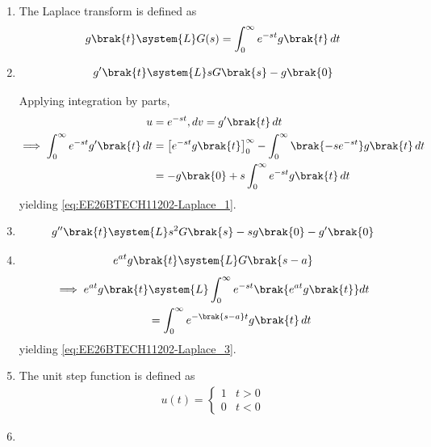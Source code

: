 \begin{enumerate}[label=\thesubsection.\arabic*, ref=\thesubsection.\theenumi]
\item The Laplace transform is defined as
\begin{align}
g\brak{t} \system{L} G(s) = \int_{0}^{\infty} e^{-st} g\brak{t} \, dt
\end{align}
\item \begin{align}
g^{\prime}\brak{t} \system{L}s G\brak{s}-g\brak{0} 
\label{eq:EE26BTECH11202-Laplace_1}
\end{align}
\solution 

Applying integration by parts, 
\begin{align}
	u &= e^{-st}, dv = g^{\prime}\brak{t} \, dt 
\\
\implies \int_{0}^{\infty} e^{-st} g^{\prime}\brak{t} \, dt
	  &=
 \left[ e^{-st} g\brak{t} \right]_{0}^{\infty} - \int_{0}^{\infty} \brak{-s e^{-st}} g\brak{t} \, dt \\
	  &=   - g\brak{0}  + s \int_{0}^{\infty} e^{-st} g\brak{t} \, dt 
\end{align}
yielding \eqref{eq:EE26BTECH11202-Laplace_1}.
\item 
\begin{align}
g^{\prime \prime}\brak{t} \system{L} s^2 G\brak{s} -sg\brak{0}-g^{\prime}\brak{0} \label{eq:EE26BTECH11202-Laplace_2}
\end{align}
\item 
\begin{align}
	e^{at} g\brak{t} \system{L} G\brak{s-a} \label{eq:EE26BTECH11202-Laplace_3}
\end{align}
\solution
\begin{align}
	\implies e^{at} g\brak{t} &\system{L} \int_{0}^{\infty} e^{-st} \brak{e^{at} g\brak{t}} dt
	\\
				  &= \int_{0}^{\infty} e^{-\brak{s - a}t} g\brak{t} \, dt
\end{align}
yielding
\eqref{eq:EE26BTECH11202-Laplace_3}.
\item The unit step function is defined as
\begin{align}
	u(t) = 
	\begin{cases}
		1 & t > 0
		\\
		0 & t < 0
	\end{cases}\label{eq:EE26BTECH11202-step-func}
\end{align}
\item 
\begin{align}

\end{align}
\end{enumerate}
